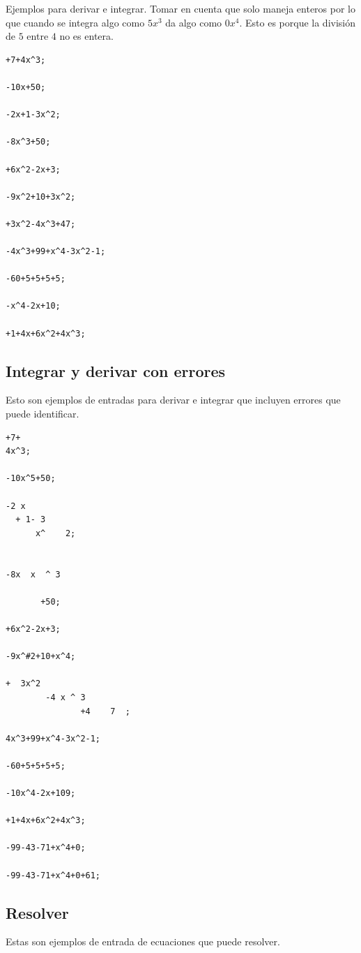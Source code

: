 \documentclass[journal]{../../IEEEtran/IEEEtran}
\begin{document}
Ejemplos para derivar e integrar. Tomar en cuenta que solo maneja
enteros por lo que cuando se integra algo como $5x^3$ da algo como
$0x^4$. Esto es porque la división de $5$ entre $4$ no es entera.
\begin{verbatim}
+7+4x^3;

-10x+50;

-2x+1-3x^2;

-8x^3+50;

+6x^2-2x+3;

-9x^2+10+3x^2;

+3x^2-4x^3+47;

-4x^3+99+x^4-3x^2-1;

-60+5+5+5+5;

-x^4-2x+10;

+1+4x+6x^2+4x^3;

\end{verbatim}

\subsection{Integrar y derivar con errores}

Esto son ejemplos de entradas para derivar e integrar que incluyen
errores que puede identificar.

\begin{verbatim}
+7+
4x^3;

-10x^5+50;

-2 x
  + 1- 3
      x^    2;


-8x  x  ^ 3

       +50;

+6x^2-2x+3;

-9x^#2+10+x^4;

+  3x^2
        -4 x ^ 3
               +4    7  ;

4x^3+99+x^4-3x^2-1;

-60+5+5+5+5;

-10x^4-2x+109;

+1+4x+6x^2+4x^3;

-99-43-71+x^4+0;

-99-43-71+x^4+0+61;

\end{verbatim}


\subsection{Resolver}
Estas son ejemplos de entrada de ecuaciones que puede resolver.
\end{document}
